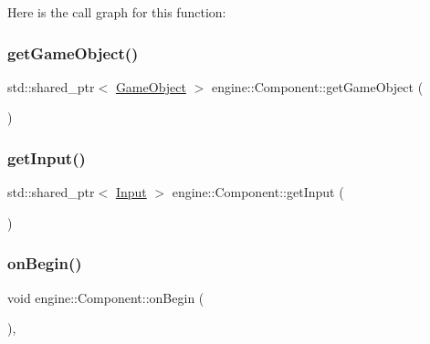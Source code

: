 Here is the call graph for this function\+:
\mbox{\label{classengine_1_1_component_a9269a0f4fdf7f59e56da2dd2876b9f5e}} 
\subsubsection{\texorpdfstring{get\+Game\+Object()}{getGameObject()}}
{\footnotesize\ttfamily std\+::shared\+\_\+ptr$<$ \mbox{\hyperlink{classengine_1_1_game_object}{Game\+Object}} $>$ engine\+::\+Component\+::get\+Game\+Object (\begin{DoxyParamCaption}{ }\end{DoxyParamCaption})}

\mbox{\label{classengine_1_1_component_a20a4dbf78931291e09056c48a887b1f6}} 
\subsubsection{\texorpdfstring{get\+Input()}{getInput()}}
{\footnotesize\ttfamily std\+::shared\+\_\+ptr$<$ \mbox{\hyperlink{classengine_1_1_input}{Input}} $>$ engine\+::\+Component\+::get\+Input (\begin{DoxyParamCaption}{ }\end{DoxyParamCaption})}

\mbox{\label{classengine_1_1_component_ad92b830daf72bca1d94f541d47477d74}} 
\subsubsection{\texorpdfstring{on\+Begin()}{onBegin()}}
{\footnotesize\ttfamily void engine\+::\+Component\+::on\+Begin (\begin{DoxyParamCaption}{ }\end{DoxyParamCaption})\hspace{0.3cm}{\ttfamily [private]}, {\ttfamily [virtual]}}



